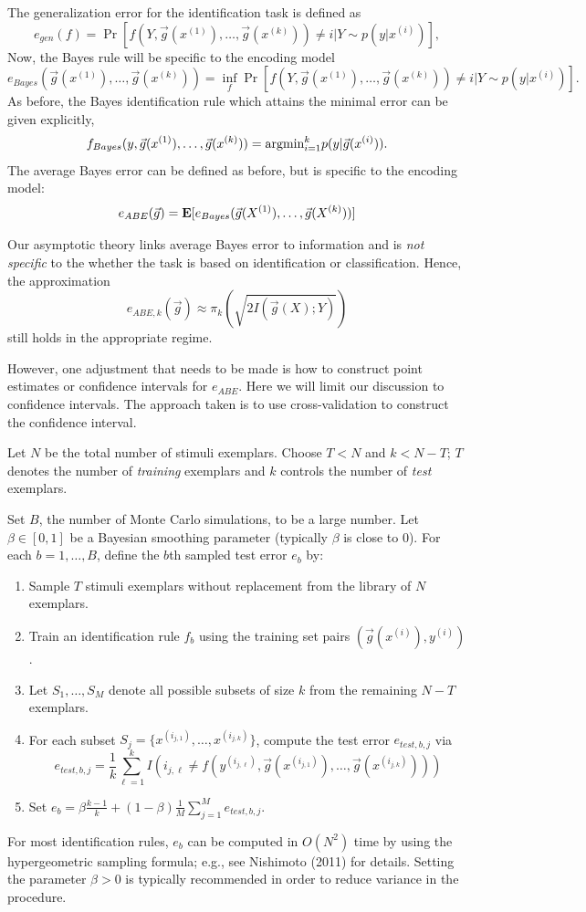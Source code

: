 \documentclass[12pt]{article}
\begin{document}
The generalization error for the identification task is defined as
\[
e_{gen}(f) = \Pr[f(Y, \vec{g}(x^{(1)}),\hdots, \vec{g}(x^{(k)})) \neq i|Y \sim p(y|x^{(i)})],
\]
Now, the Bayes rule will be specific to the encoding model
\[
e_{Bayes}(\vec{g}(x^{(1)}),\hdots, \vec{g}(x^{(k)})) = \inf_f \Pr[f(Y, \vec{g}(x^{(1)}),\hdots, \vec{g}(x^{(k)})) \neq i|Y \sim p(y|x^{(i)})].
\]
As before, the Bayes identification rule which attains the minimal error can be given explicitly,
\[
f_{Bayes}(y, \vec{g}(x^{(1)}),\hdots, \vec{g}(x^{(k)})) = \text{argmin}_{i=1}^k p(y|\vec{g}(x^{(i)})).
\]
The average Bayes error can be defined as before, but is specific to the encoding model:
\[
e_{ABE}(\vec{g}) = \textbf{E}[e_{Bayes}(\vec{g}(X^{(1)}),\hdots, \vec{g}(X^{(k)}))]
\]

Our asymptotic theory links average Bayes error to information and
is \emph{not specific} to the whether the task is based on
identification or classification.  Hence, the approximation
\[
e_{ABE, k}(\vec{g}) \approx \pi_k(\sqrt{2 I(\vec{g}(X); Y)})
\]
still holds in the appropriate regime.


However, one adjustment that needs to be made is how to construct
point estimates or confidence intervals for $e_{ABE}$.
Here we will limit our discussion to confidence intervals.
The approach taken is to use cross-validation to construct the confidence interval.

Let $N$ be the total number of stimuli exemplars.  Choose $T < N$ and
$k < N - T$; $T$ denotes the number of \emph{training} exemplars and
$k$ controls the number of \emph{test} exemplars.

Set $B$, the number of Monte Carlo simulations, to be a large number.
Let $\beta \in [0, 1]$ be a Bayesian smoothing parameter (typically $\beta$ is close to 0).
For each $b = 1,\hdots, B$, define the $b$th sampled test error $e_b$ by:
\begin{enumerate}
\item Sample $T$ stimuli exemplars without replacement from the library of $N$ exemplars.
\item Train an identification rule $f_b$ using the training set pairs $(\vec{g}(x^{(i)}), y^{(i)})$.
\item Let $S_1,\hdots, S_M$ denote all possible subsets of size $k$ from the remaining $N-T$ exemplars.
\item For each subset $S_j = \{x^{(i_{j, 1})}, \hdots, x^{(i_{j, k})}\}$, compute the test error $e_{test, b, j}$ via
\[
e_{test, b, j} = \frac{1}{k} \sum_{\ell = 1}^k I(i_{j, \ell} \neq f(y^{(i_{j, \ell})}, \vec{g}(x^{(i_{j, 1})}),\hdots, \vec{g}(x^{(i_{j, k})})))
\]
\item Set $e_b = \beta\frac{k-1}{k} + (1-\beta) \frac{1}{M} \sum_{j=1}^M e_{test, b, j}$.
\end{enumerate}
For most identification rules, $e_b$ can be computed in $O(N^2)$ time
by using the hypergeometric sampling formula; e.g., see Nishimoto
(2011) for details.  Setting the parameter $\beta > 0$ is typically
recommended in order to reduce variance in the procedure.
\end{document}
